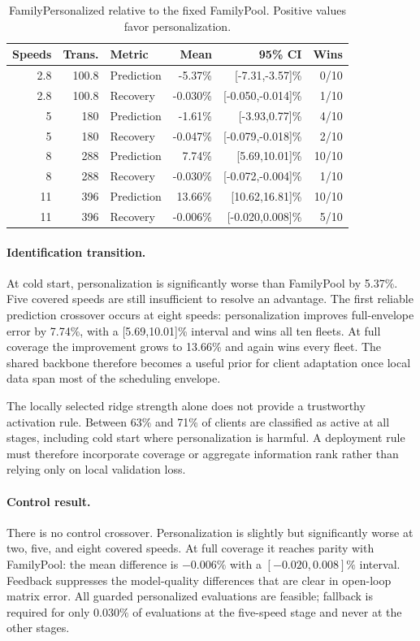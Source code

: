 \begin{table}[htbp]
\centering
\caption{FamilyPersonalized relative to the fixed FamilyPool. Positive values
favor personalization.}
\label{tab:experiment10c-comparisons}
\begin{tabular}{rrlrrr}
\toprule
Speeds & Trans. & Metric & Mean & 95\% CI & Wins\\
\midrule
2.8 & 100.8 & Prediction & -5.37\% & [-7.31,-3.57]\% & 0/10\\
2.8 & 100.8 & Recovery   & -0.030\% & [-0.050,-0.014]\% & 1/10\\
5   & 180   & Prediction & -1.61\% & [-3.93,0.77]\% & 4/10\\
5   & 180   & Recovery   & -0.047\% & [-0.079,-0.018]\% & 2/10\\
8   & 288   & Prediction & 7.74\% & [5.69,10.01]\% & 10/10\\
8   & 288   & Recovery   & -0.030\% & [-0.072,-0.004]\% & 1/10\\
11  & 396   & Prediction & 13.66\% & [10.62,16.81]\% & 10/10\\
11  & 396   & Recovery   & -0.006\% & [-0.020,0.008]\% & 5/10\\
\bottomrule
\end{tabular}
\end{table}

\paragraph{Identification transition.}
At cold start, personalization is significantly worse than FamilyPool by
5.37\%. Five covered speeds are still insufficient to resolve an advantage.
The first reliable prediction crossover occurs at eight speeds: personalization
improves full-envelope error by 7.74\%, with a [5.69,10.01]\% interval and wins
all ten fleets. At full coverage the improvement grows to 13.66\% and again
wins every fleet. The shared backbone therefore becomes a useful prior for
client adaptation once local data span most of the scheduling envelope.

The locally selected ridge strength alone does not provide a trustworthy
activation rule. Between 63\% and 71\% of clients are classified as active at
all stages, including cold start where personalization is harmful. A deployment
rule must therefore incorporate coverage or aggregate information rank rather
than relying only on local validation loss.

\paragraph{Control result.}
There is no control crossover. Personalization is slightly but significantly
worse at two, five, and eight covered speeds. At full coverage it reaches parity
with FamilyPool: the mean difference is $-0.006\%$ with a
$[-0.020,0.008]\%$ interval. Feedback suppresses the model-quality differences
that are clear in open-loop matrix error. All guarded personalized evaluations
are feasible; fallback is required for only $0.030\%$ of evaluations at the
five-speed stage and never at the other stages.

